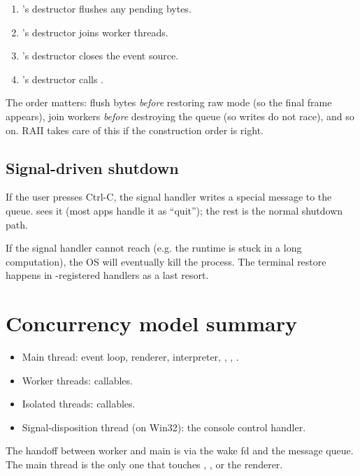 \begin{enumerate}[leftmargin=*]
  \item {}'s destructor flushes any pending bytes.
  \item {}'s destructor joins worker threads.
  \item {}'s destructor closes the event source.
  \item {}'s destructor calls .
\end{enumerate}

The order matters: flush bytes \emph{before} restoring raw mode
(so the final frame appears), join workers \emph{before}
destroying the queue (so writes do not race), and so on. RAII
takes care of this if the construction order is right.

\subsection*{Signal-driven shutdown}

If the user presses Ctrl-C, the signal handler writes a special
 message to the queue. 
sees it (most apps handle it as ``quit''); the rest is the
normal shutdown path.

If the signal handler cannot reach  (e.g. the
runtime is stuck in a long computation), the OS will eventually
kill the process. The terminal restore happens in
-registered handlers as a last resort.

\section{Concurrency model summary}

\begin{itemize}[leftmargin=*]
  \item Main thread: event loop, renderer, interpreter,
    , , .
  \item Worker threads:  callables.
  \item Isolated threads:  callables.
  \item Signal-disposition thread (on Win32): the console
    control handler.
\end{itemize}

The handoff between worker and main is via the wake fd and the
message queue. The main thread is the only one that touches
, , or the renderer.

